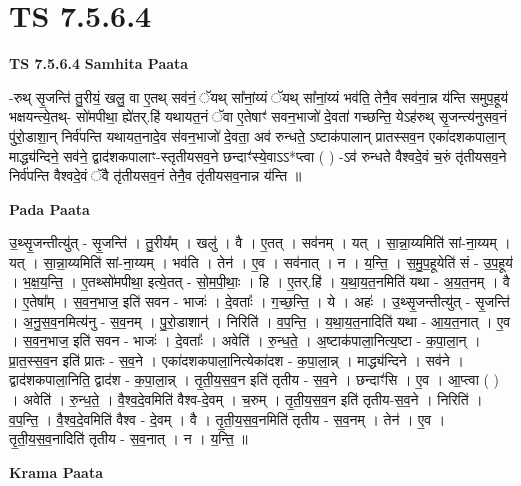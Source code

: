 \documentclass[17pt]{extarticle}
\begin{document}
\section{ TS 7.5.6.4 }

\textbf{TS 7.5.6.4 } \newline
\textbf{Samhita Paata} \newline

-रुथ् सृ॒जन्ति॑ तु॒रीयं॒ खलु॒ वा ए॒तथ् सव॑नं॒ ॅयथ् सा᳚नां॒य्यं ॅयथ् सा᳚नां॒य्यं भव॑ति॒ तेनै॒व सव॑ना॒न्न य॑न्ति समुप॒हूय॑ भक्षयन्त्ये॒तथ्- सो॑मपीथा॒ ह्ये॑तर्.हि॑ यथायत॒नं ॅवा ए॒तेषाꣳ॑ सवन॒भाजो॑ दे॒वता॑ गच्छन्ति॒ येऽह॑रुथ् सृ॒जन्त्य॑नुसव॒नं पु॑रो॒डाशा॒न् निर्व॑पन्ति यथायत॒नादे॒व स॑वन॒भाजो॑ दे॒वता॒ अव॑ रुन्धते॒ ऽष्टाक॑पालान् प्रातस्सव॒न एका॑दशकपाला॒न् माद्ध्य॑न्दिने॒ सव॑ने॒ द्वाद॑शकपालाꣳ-स्तृतीयसव॒ने छन्दाꣳ॑स्ये॒वाऽऽ*प्त्वा ( ) -ऽव॑ रुन्धते वैश्वदे॒वं च॒रुं तृ॑तीयसव॒ने निर्व॑पन्ति वैश्वदे॒वं ॅवै तृ॑तीयसव॒नं तेनै॒व तृ॑तीयसव॒नान्न य॑न्ति ॥ \newline

\textbf{Pada Paata} \newline

उ॒थ्सृ॒जन्तीत्यु॑त् - सृ॒जन्ति॑ । तु॒रीय᳚म् । खलु॑ । वै । ए॒तत् । सव॑नम् । यत् । सा॒न्ना॒य्यमिति॑ सां-ना॒य्यम् । यत् । सा॒न्ना॒य्यमिति॑ सां-ना॒य्यम् । भव॑ति । तेन॑ । ए॒व । सव॑नात् । न । य॒न्ति॒ । स॒मु॒प॒हूयेति॑ सं - उ॒प॒हूय॑ । भ॒क्ष॒य॒न्ति॒ । ए॒तथ्सो॑मपीथा॒ इत्ये॒तत् - सो॒म॒पी॒थाः॒ । हि । ए॒तर्.हि॑ । य॒था॒य॒त॒नमिति॑ यथा - अ॒य॒त॒नम् । वै । ए॒तेषा᳚म् । स॒व॒न॒भाज॒ इति॑ सवन - भाजः॑ । दे॒वताः᳚ । ग॒च्छ॒न्ति॒ । ये । अहः॑ । उ॒थ्सृ॒जन्तीत्यु॑त् - सृ॒जन्ति॑ । अ॒नु॒स॒व॒नमित्य॑नु - स॒व॒नम् । पु॒रो॒डाशान्॑ । निरिति॑ । व॒प॒न्ति॒ । य॒था॒य॒त॒नादिति॑ यथा - आ॒य॒त॒नात् । ए॒व । स॒व॒न॒भाज॒ इति॑ सवन - भाजः॑ । दे॒वताः᳚ । अवेति॑ । रु॒न्ध॒ते॒ । अ॒ष्टाक॑पाला॒नित्य॒ष्टा - क॒पा॒ला॒न् । प्रा॒त॒स्स॒व॒न इति॑ प्रातः - स॒व॒ने । एका॑दशकपाला॒नित्येका॑दश - क॒पा॒ला॒न्न् । माद्ध्य॑न्दिने । सव॑ने । द्वाद॑शकपाला॒निति॒ द्वाद॑श - क॒पा॒ला॒न्न् । तृ॒ती॒य॒स॒व॒न इति॑ तृतीय - स॒व॒ने । छन्दाꣳ॑सि । ए॒व । आ॒प्त्वा ( ) । अवेति॑ । रु॒न्ध॒ते॒ । वै॒श्व॒दे॒वमिति॑ वैश्व-दे॒वम् । च॒रुम् । तृ॒ती॒य॒स॒व॒न इति॑ तृतीय-स॒व॒ने । निरिति॑ । व॒प॒न्ति॒ । वै॒श्व॒दे॒वमिति॑ वैश्व - दे॒वम् । वै । तृ॒ती॒य॒स॒व॒नमिति॑ तृतीय - स॒व॒नम् । तेन॑ । ए॒व । तृ॒ती॒य॒स॒व॒नादिति॑ तृतीय - स॒व॒नात् । न । य॒न्ति॒ ॥  \newline


\textbf{Krama Paata} \newline
\end{document}
